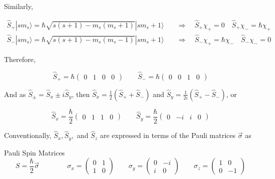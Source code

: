 Similarly, 

\begin{align} \label{}
  \hat{S}_+|s m_s \rangle = \hbar \sqrt{s(s+1) - m_s (m_s + 1)} | s m_s
  + 1 \rangle \quad &\Rightarrow \quad \hat{S}_+ \chi_+ = 0 \quad \hat{S}_+
  \chi_- = \hbar \chi_+ \\ 
  \hat{S}_-|s m_s \rangle = \hbar \sqrt{s(s+1) - m_s(m_s - 1)}|s m_s
  + 1 \rangle \quad &\Rightarrow \quad \hat{S}_-\chi_+ = \hbar \chi_- \quad
  \hat{S}_-\chi_- = 0
\end{align}\vspace{3px}


Therefore, 

\[
\hat{S}_+ = \hbar \begin{pmatrix}
  0 & 1 & 0 & 0 
\end{pmatrix} \qquad \hat{S}_- = \hbar \begin{pmatrix}
  0 & 0& 1 & 0
\end{pmatrix} 
\] \vspace{3px}

And as $\hat{S}_\pm = \hat{S}_x \pm i \hat{S}_y$, then $\hat{S}_x = \frac{1}{2}
( \hat{S}_+ + \hat{S}_- )$ and $\hat{S}_y = \frac{1}{2i} (\hat{S}_+
- \hat{S}_-)$, or 

\[
\hat{S}_x = \frac{\hbar}{2} \begin{pmatrix}
  0 & 1 & 1 & 0
\end{pmatrix} \qquad \hat{S}_y = \frac{\hbar}{2} \begin{pmatrix}
  0 & -i & i & 0
\end{pmatrix} 
\] \vspace{3px}

Conventionally, $\hat{S}_x, \hat{S}_y,$ and $\hat{S}_z$ are expressed in terms
of the Pauli matrices $\vec{\sigma}$ as 

\begin{subbox}{Pauli Spin Matrices}
  \[
  \hat{S} = \frac{\hbar}{2} \vec{\sigma} \qquad \qquad \sigma_x = \begin{pmatrix}
    0 & 1 \\ 1 & 0 
  \end{pmatrix} \qquad \sigma_y = \begin{pmatrix}
    0 & -i \\ i & 0 
  \end{pmatrix} \qquad \sigma_z = \begin{pmatrix}
    1 & 0 \\ 0 & -1
  \end{pmatrix} 
  \] 
\end{subbox}

